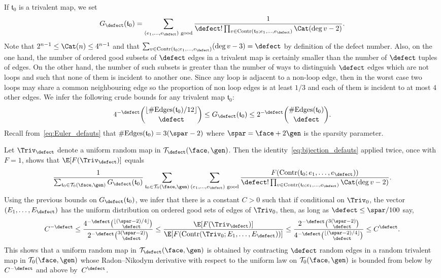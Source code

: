 If $\mathfrak{t}_0$ is a trivalent map, we set
\[
G_\defect(\mathfrak{t}_0) = \sum_{(e_1, \dots, e_{\defect}) \text{ good}} \frac{1}{\defect! \prod_{v \in \mathrm{Contr}(\mathfrak{t}_0 ; e_1, \dots, e_{\defect})} \Cat(\deg v - 2)}.
\]
Note that $2^{n-1} \le \Cat(n) \le 4^{n-1}$ and that $\sum_{v \in \mathrm{Contr}(\mathfrak{t}_0 ; e_1, \dots, e_{\defect})} (\deg v - 3) = \defect$ by definition of the defect number. Also, on the one hand, the number of ordered good subsets of $\defect$ edges in a trivalent map is certainly smaller than the number of $\defect$ tuples of edges.
On the other hand, the number of such subsets is greater than the number of ways to distinguish $\defect$ edges which are not loops and such that none of them is incident to another one. Since any loop is adjacent to a non-loop edge, then in the worst case two loops may share a common neighbouring edge so the proportion of non loop edges is at least $1/3$ and each of them is incident to at most $4$ other edges.
We infer the following crude bounds for any trivalent map $\mathfrak{t}_0$:
\[
4^{-\defect} \binom{\lfloor \#\mathrm{Edges}(\mathfrak{t}_0)/12\rfloor}{\defect} \le G_\defect(\mathfrak{t}_0) \le 2^{-\defect} \binom{\#\mathrm{Edges}(\mathfrak{t}_0)}{\defect}.
\]
Recall from~\eqref{eq:Euler_defauts} that $\#\mathrm{Edges}(\mathfrak{t}_0) = 3(\spar-2)$ where $\spar = \face+2\gen$ is the sparsity parameter.

Let $\Triv_\defect$ denote a uniform random map in $\mathcal{T}_{\defect}(\face,\gen)$. Then the identity~\eqref{eq:bijection_defauts} applied twice, once with $F=1$, shows that $\E[F(\Triv_{ \defect})]$ equals
\[
\frac{1}{\sum_{\mathfrak{t}_0 \in \mathcal{T}_0(\face, \gen)} G_\defect(\mathfrak{t}_0)} \sum_{\mathfrak{t}_0 \in \mathcal{T}_0(\face, \gen)} \sum_{(e_1, \dots, e_\defect) \text{ good}} \frac{F(\mathrm{Contr}(\mathfrak{t}_0 ; e_1, \dots, e_\defect))}{\defect! \prod_{v \in \mathrm{Contr}(\mathfrak{t}_0 ; e_1, \dots, e_\defect)} \Cat(\deg v - 2)}.
\]
Using the previous bounds on $G_\defect(\mathfrak{t}_0)$, we infer that there is a constant $C>0$ such that if conditional on $\Triv_0$, the vector $(E_1, \dots, E_\defect)$ has the uniform distribution on ordered good sets of edges of $\Triv_0$, then, as long as $ \defect \le \spar/100$ say,
\begin{equation} \label{eq:RNexp}
C^{-\defect}
\le \frac{4^{-\defect} \binom{\lfloor (\spar-2)/4\rfloor}{\defect}}{2^{-\defect} \binom{3 (\spar-2)}{\defect}}
\le \frac{\E[F(\Triv_{ \defect})]}{\E[F(\mathrm{Contr}(\Triv_0 ; E_1, \dots, E_\defect))]}
\le \frac{2^{-\defect} \binom{3 (\spar-2)}{\defect}}{4^{-\defect} \binom{\lfloor (\spar-2)/4\rfloor}{\defect}}
\le C^\defect.
\end{equation}
This shows that a uniform random map in $\mathcal{T}_{\defect}(\face,\gen)$ is obtained by contracting $ \defect$ random edges in a random trivalent map in $\mathcal{T}_{0}(\face, \gen)$ whose Radon--Nikodym derivative with respect to the uniform law on $\mathcal{T}_{0}(\face, \gen)$ is bounded from below by~$C^{- \defect}$ and above by~$C^{ \defect}$.

